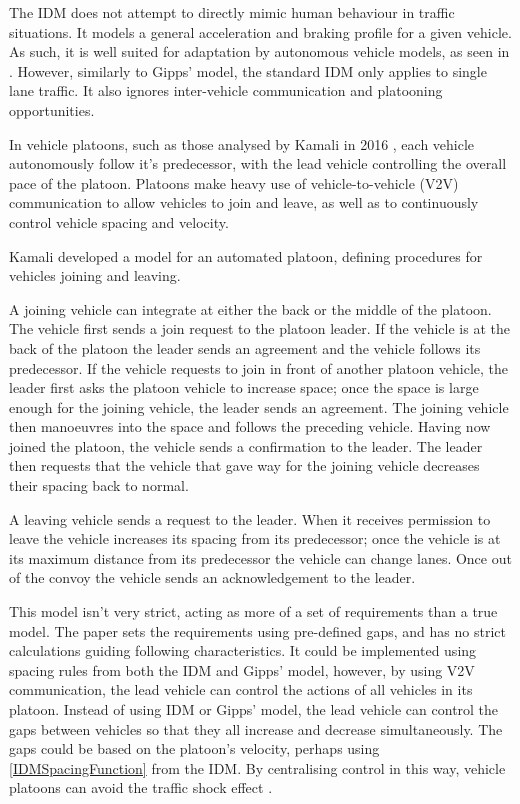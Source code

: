 The IDM does not attempt to directly mimic human behaviour in traffic situations. It models a general acceleration and braking profile for a given vehicle. As such, it is well suited for adaptation by autonomous vehicle models, as seen in \citep{Kesting2007}. However, similarly to Gipps' model, the standard IDM only applies to single lane traffic. It also ignores inter-vehicle communication and platooning opportunities. 

In vehicle platoons, such as those analysed by Kamali in 2016 \citep{Kamali2016}, each vehicle autonomously follow it's predecessor, with the lead vehicle controlling the overall pace of the platoon. Platoons make heavy use of vehicle-to-vehicle (V2V) communication to allow vehicles to join and leave, as well as to continuously control vehicle spacing and velocity.

Kamali developed a model for an automated platoon, defining procedures for vehicles joining and leaving. 

A joining vehicle can integrate at either the back or the middle of the platoon. The vehicle first sends a join request to the platoon leader. If the vehicle is at the back of the platoon the leader sends an agreement and the vehicle follows its predecessor. If the vehicle requests to join in front of another platoon vehicle, the leader first asks the platoon vehicle to increase space; once the space is large enough for the joining vehicle, the leader sends an agreement. The joining vehicle then manoeuvres into the space and follows the preceding vehicle. Having now joined the platoon, the vehicle sends a confirmation to the leader. The leader then requests that the vehicle that gave way for the joining vehicle decreases their spacing back to normal.

A leaving vehicle sends a request to the leader. When it receives permission to leave the vehicle increases its spacing from its predecessor; once the vehicle is at its maximum distance from its predecessor the vehicle can change lanes. Once out of the convoy the vehicle sends an acknowledgement to the leader.

This model isn't very strict, acting as more of a set of requirements than a true model. The paper sets the requirements using pre-defined gaps, and has no strict calculations guiding following characteristics. It could be implemented using spacing rules from both the IDM and Gipps' model, however, by using V2V communication, the lead vehicle can control the actions of all vehicles in its platoon. Instead of using IDM or Gipps' model, the lead vehicle can control the gaps between vehicles so that they all increase and decrease simultaneously. The gaps could be based on the platoon's velocity, perhaps using \eqref{IDMSpacingFunction} from the IDM. By centralising control in this way, vehicle platoons can avoid the traffic shock effect \citep{Daganzo1994}.

